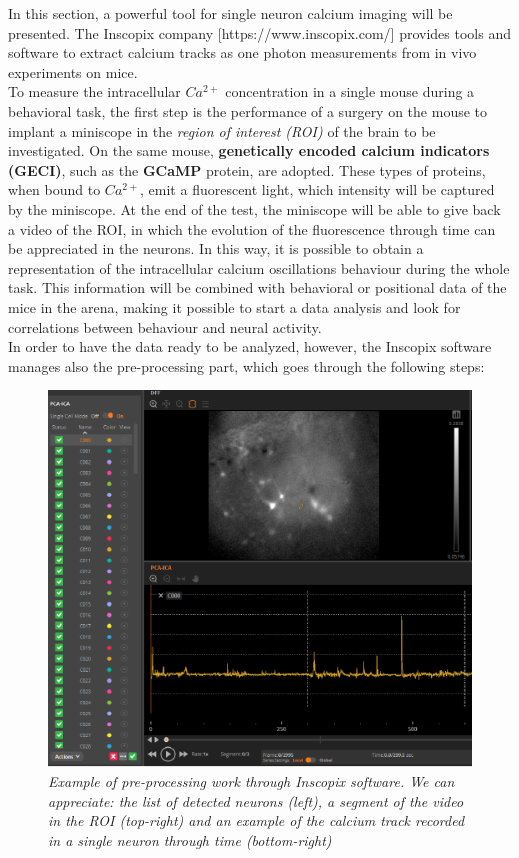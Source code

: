\documentclass[a4paper]{article}
\begin{document}
In this section, a powerful tool for single neuron calcium imaging will be presented. The Inscopix company [https://www.inscopix.com/] provides tools and software to extract calcium tracks as one photon measurements from in vivo experiments on mice.\\
To measure the intracellular $Ca^{2+}$ concentration in a single mouse during a behavioral task, the first step is the performance of a surgery on the mouse to implant a miniscope in the \textit{region of interest (ROI)} of the brain to be investigated. On the same mouse, \textbf{genetically encoded calcium indicators (GECI)}, such as the \textbf{GCaMP} protein, are adopted. These types of proteins, when bound to $Ca^{2+}$, emit a fluorescent light, which intensity will be captured by the miniscope. At the end of the test, the miniscope will be able to give back a video of the ROI, in which the evolution of the fluorescence through time can be appreciated  in the neurons. In this way, it is possible to obtain a representation of the intracellular calcium oscillations behaviour during the whole task. This information will be combined with behavioral or positional data of the mice in the arena, making it possible to start a data analysis and look for correlations between behaviour and neural activity.\\
In order to have the data ready to be analyzed, however, the Inscopix software manages also the pre-processing part, which goes through the following steps:

\begin{figure}[H]
	\begin{center}
		\includegraphics[scale=.70]{Inscopix2.png} 
	\end{center} 
	\caption{\textit{Example of pre-processing work through Inscopix software. We can appreciate: the list of detected neurons (left), a segment of the video in the ROI (top-right) and an example of the calcium track recorded in a single neuron through time (bottom-right)}}
	
\end{figure}
\end{document}
